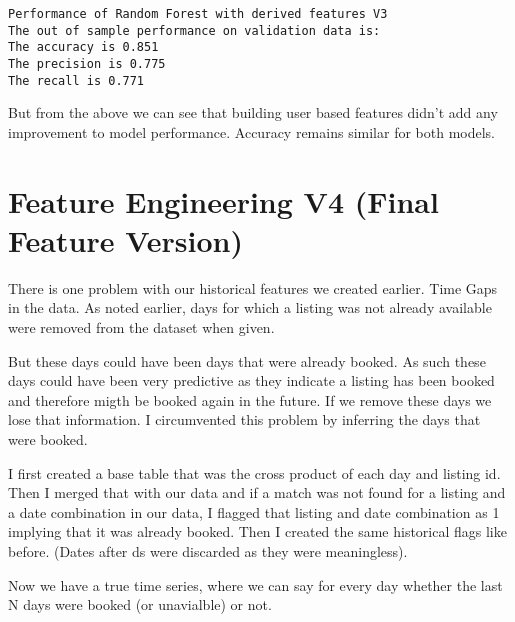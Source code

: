 \documentclass[11pt]{article}
\begin{document}
    \begin{Verbatim}[commandchars=\\\{\}]
Performance of Random Forest with derived features V3
The out of sample performance on validation data is:
The accuracy is 0.851
The precision is 0.775
The recall is 0.771

    \end{Verbatim}

    But from the above we can see that building user based features didn't
add any improvement to model performance. Accuracy remains similar for
both models.

\section{Feature Engineering V4 (Final Feature
Version)}\label{feature-engineering-v4-final-feature-version}

There is one problem with our historical features we created earlier.
Time Gaps in the data. As noted earlier, days for which a listing was
not already available were removed from the dataset when given.

But these days could have been days that were already booked. As such
these days could have been very predictive as they indicate a listing
has been booked and therefore migth be booked again in the future. If we
remove these days we lose that information. I circumvented this problem
by inferring the days that were booked.

I first created a base table that was the cross product of each day and
listing id. Then I merged that with our data and if a match was not
found for a listing and a date combination in our data, I flagged that
listing and date combination as 1 implying that it was already booked.
Then I created the same historical flags like before. (Dates after ds
were discarded as they were meaningless).

Now we have a true time series, where we can say for every day whether
the last N days were booked (or unavialble) or not.
\end{document}
